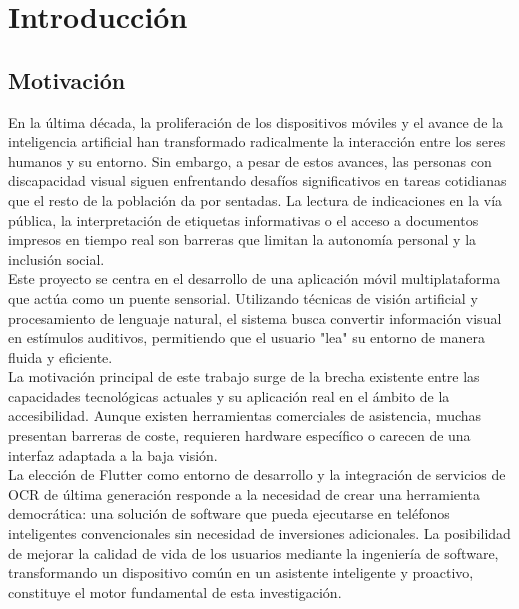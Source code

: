 
\chapter{Introducción}  

\section{Motivación}

En la última década, la proliferación de los dispositivos móviles y el avance de la inteligencia artificial han transformado radicalmente la interacción entre los seres humanos y su entorno. Sin embargo, a pesar de estos avances, las personas con discapacidad visual siguen enfrentando desafíos significativos en tareas cotidianas que el resto de la población da por sentadas. La lectura de indicaciones en la vía pública, la interpretación de etiquetas informativas o el acceso a documentos impresos en tiempo real son barreras que limitan la autonomía personal y la inclusión social.\\

Este proyecto se centra en el desarrollo de una aplicación móvil multiplataforma que actúa como un puente sensorial. Utilizando técnicas de visión artificial y procesamiento de lenguaje natural, el sistema busca convertir información visual en estímulos auditivos, permitiendo que el usuario "lea" su entorno de manera fluida y eficiente.\\

La motivación principal de este trabajo surge de la brecha existente entre las capacidades tecnológicas actuales y su aplicación real en el ámbito de la accesibilidad. Aunque existen herramientas comerciales de asistencia, muchas presentan barreras de coste, requieren hardware específico o carecen de una interfaz adaptada a la baja visión.\\

La elección de Flutter como entorno de desarrollo y la integración de servicios de OCR de última generación responde a la necesidad de crear una herramienta democrática: una solución de software que pueda ejecutarse en teléfonos inteligentes convencionales sin necesidad de inversiones adicionales. La posibilidad de mejorar la calidad de vida de los usuarios mediante la ingeniería de software, transformando un dispositivo común en un asistente inteligente y proactivo, constituye el motor fundamental de esta investigación.\\

